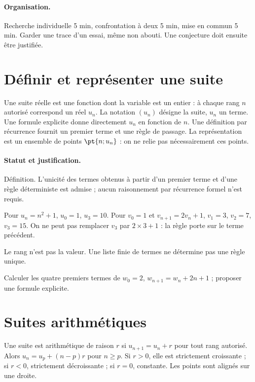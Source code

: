\paragraph{Organisation.} Recherche individuelle 5 min, confrontation à deux 5 min, mise en commun 5 min. Garder une trace d’un essai, même non abouti. Une conjecture doit ensuite être justifiée.
\mxnewpage
\section{Définir et représenter une suite}\label{C01-U1}
\begin{keypoint}
Une suite réelle est une fonction dont la variable est un entier : à chaque rang $n$ autorisé correspond un réel $u_n$. La notation $(u_n)$ désigne la suite, $u_n$ un terme. Une formule explicite donne directement $u_n$ en fonction de $n$. Une définition par récurrence fournit un premier terme et une règle de passage. La représentation est un ensemble de points $\pt{n;u_n}$ : on ne relie pas nécessairement ces points.
\end{keypoint}
\paragraph{Statut et justification.} Définition. L’unicité des termes obtenus à partir d’un premier terme et d’une règle déterministe est admise ; aucun raisonnement par récurrence formel n’est requis.
\begin{example}Pour $u_n=n^2+1$, $u_0=1$, $u_3=10$. Pour $v_0=1$ et $v_{n+1}=2v_n+1$, $v_1=3$, $v_2=7$, $v_3=15$. On ne peut pas remplacer $v_3$ par $2\times3+1$ : la règle porte sur le terme précédent.\end{example}\label{C01-EX1}
\begin{pitfall}Le rang n’est pas la valeur. Une liste finie de termes ne détermine pas une règle unique.\end{pitfall}
\begin{application}Calculer les quatre premiers termes de $w_0=2$, $w_{n+1}=w_n+2n+1$ ; proposer une formule explicite.\end{application}\label{C01-AP1}
\section{Suites arithmétiques}\label{C01-U2}
\begin{keypoint}
Une suite est arithmétique de raison $r$ si $u_{n+1}=u_n+r$ pour tout rang autorisé. Alors $u_n=u_p+(n-p)r$ pour $n\geq p$. Si $r>0$, elle est strictement croissante ; si $r<0$, strictement décroissante ; si $r=0$, constante. Les points sont alignés sur une droite.
\end{keypoint}
